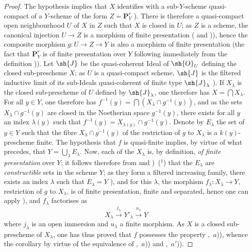 \begin{proof}
The hypothesis implies that $X$ identifies with a sub-$Y$-scheme quasi-compact of a $Y$-scheme of the form $Z=\mathbf{P}^r_Y$ ).
There is therefore a quasi-compact open neighbourhood $U$ of $X$ in $Z$ such that $X$ is closed in $U$; as $Z$ is a scheme, the canonical injection $U\to Z$ is a morphism of finite presentation ( and )), hence the composite morphism $g:U\to Z\to Y$ is also a morphism of finite presentation (the fact that $\mathbf{P}^r_Y$ is of finite presentation over $Y$ following immediately from the definition )).
Let $\sh{J}$ be the quasi-coherent Ideal of $\sh{O}_U$ defining the closed sub-prescheme $X$; as $U$ is a quasi-compact scheme, $\sh{J}$ is the filtered inductive limit of its sub-Ideals quasi-coherent of finite type $\sh{J}_\lambda$ ).
If $X_\lambda$ is the closed sub-prescheme of $U$ defined by $\sh{J}_\lambda$, one therefore has $X=\bigcap X_\lambda$.
For all $y\in Y$, one therefore has $f^{-1}(y)=\bigcap(X_\lambda\cap g^{-1}(y))$, and as the sets $X_\lambda\cap g^{-1}(y)$ are closed in the Noetherian space $g^{-1}(y)$, there exists for all $y$ an index $\lambda(y)$ such that $f^{-1}(y)=X_{\lambda(y)}\cap g^{-1}(y)$.
Denote by $E_\lambda$ the set of $y\in Y$ such that the fibre $X_\lambda\cap g^{-1}(y)$ of the restriction of $g$ to $X_\lambda$ is a $k(y)$-prescheme finite.
The hypothesis that $f$ is quasi-finite implies, by virtue of what precedes, that $Y=\bigcup_\lambda E_\lambda$.
Now, each of the $X_\lambda$ is, by definition, \emph{of finite presentation} over $Y$; it follows therefore from  and )~($^1$) that the $E_\lambda$ are \emph{constructible} sets in the scheme $Y$; as they form a filtered increasing family, there exists an index $\lambda$ such that $E_\lambda=Y$ ), and for this $\lambda$, the morphism $f_\lambda:X_\lambda\to Y$, restriction of $g$ to $X_\lambda$, is of finite presentation, finite and separated, hence one can apply ), and $f_\lambda$ factorises as
\[
X_\lambda\xrightarrow{j_\lambda}Y'_\lambda\xrightarrow{u_\lambda}Y
\]
where $j_\lambda$ is an open immersion and $u_\lambda$ a finite morphism.
As $X$ is a closed sub-prescheme of $X_\lambda$, one has thus proved that $f$ possesses the property ,~$a$)), whence the corollary by virtue of the equivalence of ,~$a$)) and ,~$a'$)).
\end{proof}

